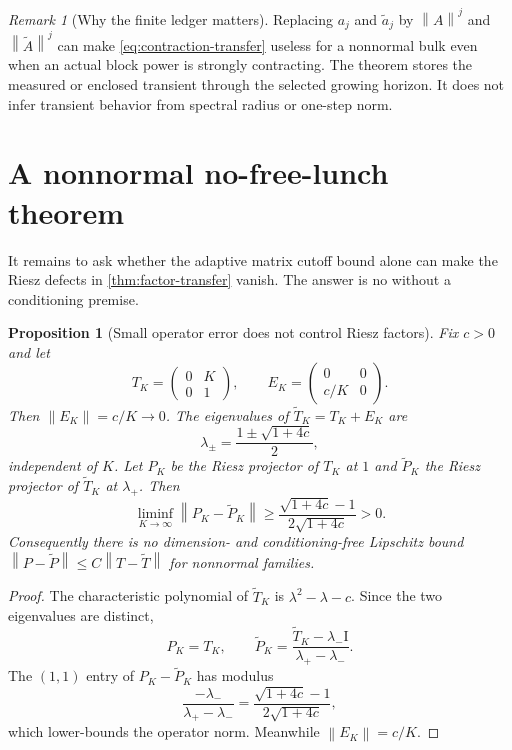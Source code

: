 \documentclass[11pt]{article}
\newtheorem{proposition}[theorem]{Proposition}
\theoremstyle{definition}
\theoremstyle{remark}
\newtheorem{remark}[theorem]{Remark}
\newcommand{\Id}{\mathrm I}
\newcommand{\norm}[1]{\left\lVert #1\right\rVert}
\begin{document}
\begin{remark}[Why the finite ledger matters]
Replacing $a_j$ and $\widetilde a_j$ by $\norm A^j$ and
$\norm{\widetilde A}^j$ can make \eqref{eq:contraction-transfer} useless for
a nonnormal bulk even when an actual block power is strongly contracting.
The theorem stores the measured or enclosed transient through the selected
growing horizon.  It does not infer transient behavior from spectral radius
or one-step norm.
\end{remark}

\section{A nonnormal no-free-lunch theorem}

It remains to ask whether the adaptive matrix cutoff bound alone can make
the Riesz defects in \cref{thm:factor-transfer} vanish.  The answer is no
without a conditioning premise.

\begin{proposition}[Small operator error does not control Riesz factors]
\label{prop:no-go}
Fix $c>0$ and let
\[
 T_K=\begin{pmatrix}0&K\\0&1\end{pmatrix},
 \qquad
 E_K=\begin{pmatrix}0&0\\c/K&0\end{pmatrix}.
\]
Then $\norm{E_K}=c/K\to0$.  The eigenvalues of
$\widetilde T_K=T_K+E_K$ are
\[
 \lambda_\pm=\frac{1\pm\sqrt{1+4c}}2,
\]
independent of $K$.  Let $P_K$ be the Riesz projector of $T_K$ at $1$ and
$\widetilde P_K$ the Riesz projector of $\widetilde T_K$ at $\lambda_+$.
Then
\begin{equation}
 \liminf_{K\to\infty}\norm{P_K-\widetilde P_K}
 \ge\frac{\sqrt{1+4c}-1}{2\sqrt{1+4c}}>0.
 \label{eq:no-go}
\end{equation}
Consequently there is no dimension- and conditioning-free Lipschitz bound
$\norm{P-\widetilde P}\le C\norm{T-\widetilde T}$ for nonnormal families.
\end{proposition}

\begin{proof}
The characteristic polynomial of $\widetilde T_K$ is
$\lambda^2-\lambda-c$.  Since the two eigenvalues are distinct,
\[
 P_K=T_K,
 \qquad
 \widetilde P_K
 =\frac{\widetilde T_K-\lambda_-\Id}
 {\lambda_+-\lambda_-}.
\]
The $(1,1)$ entry of $P_K-\widetilde P_K$ has modulus
\[
 \frac{-\lambda_-}{\lambda_+-\lambda_-}
 =\frac{\sqrt{1+4c}-1}{2\sqrt{1+4c}},
\]
which lower-bounds the operator norm.  Meanwhile $\norm{E_K}=c/K$.
\end{proof}
\end{document}
